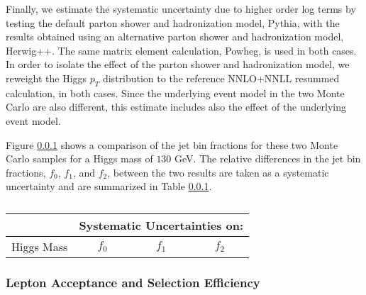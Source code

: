 
Finally, we estimate the systematic uncertainty due to higher order log terms by testing the default 
parton shower and hadronization model, Pythia, with the results obtained using an alternative
parton shower and hadronization model, Herwig++. The same matrix element calculation, Powheg,
is used in both cases. In order to isolate the effect of the parton shower and hadronization 
model, we reweight the Higgs $p_{T}$ distribution to the reference NNLO+NNLL resummed calculation,
in both cases. Since the underlying event model in the two Monte Carlo are also different, this
estimate includes also the effect of the underlying event model. 

Figure \ref{} shows a comparison of the jet bin fractions for these two Monte Carlo samples
for a Higgs mass of $130$ GeV. The relative differences in the jet bin fractions,
$f_{0}$, $f_{1}$, and $f_{2}$, between the two results are taken as a systematic
uncertainty and are summarized in Table \ref{}.

\begin{table}[!htbp]
\begin{center}
\begin{tabular}{|c|c|c|c|}

\hline
               &   \multicolumn{3}{|c|}{ Systematic Uncertainties on: } \\
\hline
Higgs Mass     &   $f_{0}$   &  $f_{1}$       &   $f_{2}$       \\
\hline


\end{tabular}
\caption{  }
\label{tab:JetBinFractionSystematics_PartonShower}
\end{center}
\end{table}



\subsubsection{Lepton Acceptance and Selection Efficiency }






